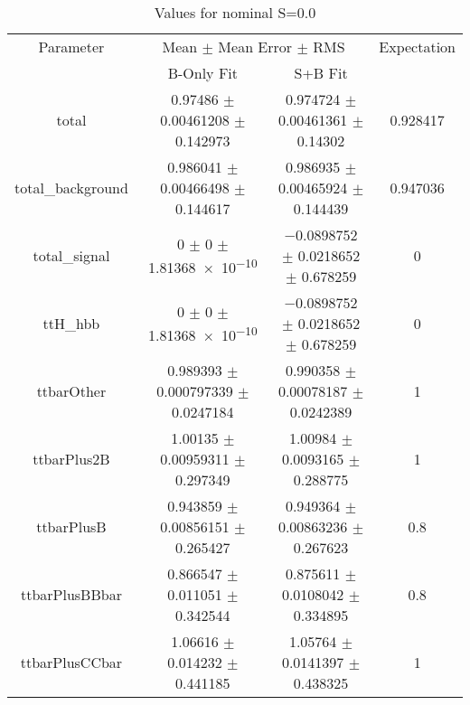\begin{table}
\centering
\caption{Values for nominal S=0.0}
\begin{tabular}{cccc}
\toprule
Parameter & \multicolumn{2}{c}{Mean $\pm$ Mean Error $\pm$ RMS} & Expectation\\
 & B-Only Fit & S+B Fit & \\
\midrule
total & \num{0.97486} $\pm$ \num{0.00461208} $\pm$ \num{0.142973} & \num{0.974724} $\pm$ \num{0.00461361} $\pm$ \num{0.14302} & \num{0.928417}\\
total\_background & \num{0.986041} $\pm$ \num{0.00466498} $\pm$ \num{0.144617} & \num{0.986935} $\pm$ \num{0.00465924} $\pm$ \num{0.144439} & \num{0.947036}\\
total\_signal & \num{0} $\pm$ \num{0} $\pm$ \num{1.81368e-10} & \num{-0.0898752} $\pm$ \num{0.0218652} $\pm$ \num{0.678259} & \num{0}\\
ttH\_hbb & \num{0} $\pm$ \num{0} $\pm$ \num{1.81368e-10} & \num{-0.0898752} $\pm$ \num{0.0218652} $\pm$ \num{0.678259} & \num{0}\\
ttbarOther & \num{0.989393} $\pm$ \num{0.000797339} $\pm$ \num{0.0247184} & \num{0.990358} $\pm$ \num{0.00078187} $\pm$ \num{0.0242389} & \num{1}\\
ttbarPlus2B & \num{1.00135} $\pm$ \num{0.00959311} $\pm$ \num{0.297349} & \num{1.00984} $\pm$ \num{0.0093165} $\pm$ \num{0.288775} & \num{1}\\
ttbarPlusB & \num{0.943859} $\pm$ \num{0.00856151} $\pm$ \num{0.265427} & \num{0.949364} $\pm$ \num{0.00863236} $\pm$ \num{0.267623} & \num{0.8}\\
ttbarPlusBBbar & \num{0.866547} $\pm$ \num{0.011051} $\pm$ \num{0.342544} & \num{0.875611} $\pm$ \num{0.0108042} $\pm$ \num{0.334895} & \num{0.8}\\
ttbarPlusCCbar & \num{1.06616} $\pm$ \num{0.014232} $\pm$ \num{0.441185} & \num{1.05764} $\pm$ \num{0.0141397} $\pm$ \num{0.438325} & \num{1}\\
\bottomrule
\end{tabular}
\end{table}